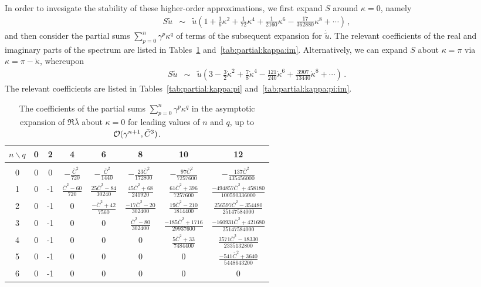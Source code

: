 \documentclass[12pt,a5paper]{article}
\begin{document}
In order to invesigate the stability of these higher-order approximations, we first expand $S$ around $\kappa=0$, namely
\begin{eqnarray}
S\tilde{u} & \sim & \tilde{u}\left(1+\frac{1}{6}\kappa^2+\frac{1}{72}\kappa^4
+\frac{1}{2160}\kappa^6-\frac{17}{362880}\kappa^8+\cdots\right)\,,
\end{eqnarray}
and then consider the partial sums $\sum_{p=0}^{n}\gamma^p\kappa^q$ of terms of the
subsequent expansion for $\dot{\tilde{u}}$. The relevant coefficients of the
real and imaginary parts of the spectrum are listed in Tables~\ref{tab:partial:kappa}
and~\ref{tab:partial:kappa:im}.
Alternatively, we can expand $S$ about $\kappa=\pi$ via $\kappa=\pi-\grave{\kappa}$, whereupon
\begin{eqnarray}
S\tilde{u} & \sim & \tilde{u}\left(3-\frac{3}{2}\grave{\kappa}^2+\frac{7}{8}\grave{\kappa}^4
-\frac{121}{240}\grave{\kappa}^6+\frac{3907}{13440}\grave{\kappa}^8+\cdots\right)\,.
\end{eqnarray}
 The relevant coefficients are listed in Tables~\ref{tab:partial:kappa:pi} and~\ref{tab:partial:kappa:pi:im}.

\begin{table}[hbtp]
\centering
\begin{tabular}{|c|c|c|c|c|c|c|c|}
\hline
$n\backslash q$ & 0 & 2 & 4 & 6 & 8 & 10 & 12\\
\hline
&&&&&&&\\[-2ex]
0 & 0 & 0 & $-\frac{\bar{C}^2}{720}$ & $-\frac{\bar{C}^2}{1440}$ & $-\frac{23\bar{C}^2}{172800}$        
   & $-\frac{97\bar{C}^2}{7257600}$            & $-\frac{137\bar{C}^2}{435456000}$
\\[1ex]
1 & 0 & -1 & $\frac{\bar{C}^2-60}{720}$ & $\frac{25\bar{C}^2-84}{30240}$
   & $\frac{45\bar{C}^2+68}{241920}$  & $\frac{61\bar{C}^2+396}{7257600}$
   & $\frac{-494857\bar{C}^2+458180}{100590336000}$
\\[1ex]
2 & 0 & -1 & 0 & $\frac{-\bar{C}^2+42}{7560}$ & $\frac{-17\bar{C}^2-20}{302400}$
   & $\frac{19\bar{C}^2-210}{1814400}$ & $\frac{256597\bar{C}^2-354480}{25147584000}$
\\[1ex]
3 & 0 & -1 & 0 & 0 & $\frac{\bar{C}^2-80}{302400}$ & $\frac{-185\bar{C}^2+1716}{29937600}$
   & $\frac{-160931\bar{C}^2+421680}{25147584000}$
\\[1ex]
4 & 0 & -1 & 0 & 0 & 0 & $\frac{5\bar{C}^2+33}{7484400}$ 
   & $\frac{3571\bar{C}^2-18330}{2335132800}$
\\[1ex]
5 & 0 & -1 & 0 & 0 & 0 & 0  & $\frac{-541\bar{C}^2+3640}{5448643200}$
\\[1ex]
6 & 0 & -1 & 0 & 0 & 0 & 0 & 0\\[1ex]
\hline
\end{tabular}
\caption{The coefficients of the partial sums $\sum_{p=0}^{n}\gamma^p\kappa^q$ in the 
asymptotic expansion of $\Re\bar{\lambda}$ about $\kappa=0$ for leading values of $n$ and $q$, up to 
${\cal O}(\gamma^{n+1},\bar{C}^3)$.}
\label{tab:partial:kappa}
\end{table}
\end{document}
